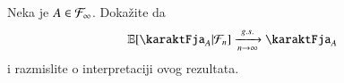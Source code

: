 \begin{zad} \label{zad:25.11}
    Neka je $A \in \mathcal{F}_\infty$.
    Doka\v zite da
    \begin{equation*}
        \masE [\karaktFja_A | \famF_n] \xrightarrow[n \to \infty]{g.s.} \karaktFja_A
    \end{equation*}
    i razmislite o interpretaciji ovog rezultata.
\end{zad}